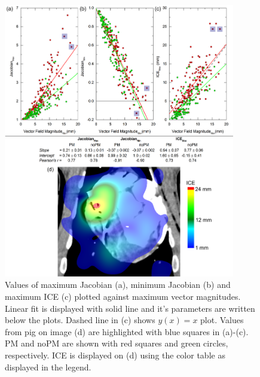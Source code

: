 \documentclass[type=dr, dr=rernat, accentcolor=tud7b,colorbacktitle, bigchapter, openright, twoside, 12pt ]{tudthesis}
\begin{document}

\begin{figure}[H]
	\begin{center}		
		\includegraphics[width=0.9\textwidth]{./Images/MaxVfdata_pigs.png}
		\caption{Values of maximum Jacobian (a), minimum Jacobian (b) and maximum ICE (c) plotted against maximum vector magnitudes. Linear fit is displayed with solid line and it's parameters are written below the plots. Dashed line in (c) shows $y(x)= x$ plot. Values from pig on image (d) are highlighted with blue squares in (a)-(c). PM and noPM are shown with red squares and green circles, respectively.
			ICE is displayed on (d) using the color table as displayed in the legend.}
		\label{maxvf_pigs}
	\end{center}
\end{figure}
\end{document}
